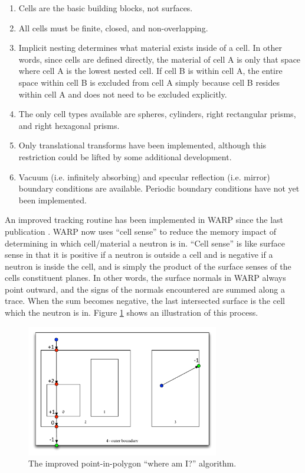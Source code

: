 \documentclass[preprint,12pt]{elsarticle}
\begin{document}
\begin{enumerate}
\item Cells are the basic building blocks, not surfaces.
\item All cells must be finite, closed, and non-overlapping.
\item Implicit nesting determines what material exists inside of a cell.  In other words, since cells are defined directly, the material of cell A is only that space where cell A is the lowest nested cell.  If cell B is within cell A, the entire space within cell B is excluded from cell A simply because cell B resides within cell A and does not need to be excluded explicitly.
\item The only cell types available are spheres, cylinders, right rectangular prisms, and right hexagonal prisms.
\item Only translational transforms have been implemented, although this restriction could be lifted by some additional development.
\item Vacuum (i.e. infinitely absorbing) and specular reflection  (i.e. mirror) boundary conditions are available.  Periodic boundary conditions have not yet been implemented.
\end{enumerate}

An improved tracking routine has been implemented in WARP since the last publication \cite{dissertation}.  WARP now uses ``cell sense'' to reduce the memory impact of determining in which cell/material a neutron is in.  ``Cell sense'' is like surface sense in that it is positive if a neutron is outside a cell and is negative if a neutron is inside the cell, and is simply the product of the surface senses of the cells constituent planes.  In other words, the surface normals in WARP always point outward, and the signs of the normals encountered are summed along a trace.  When the sum becomes negative, the last intersected surface is the cell which the neutron is in.   Figure \ref{whereami} shows an illustration of this process.

\begin{figure}[h!]
\centering
\includegraphics[width=0.75\textwidth]{graphics/whereami-new.pdf}
\caption{The improved point-in-polygon ``where am I?'' algorithm. \label{whereami} }
\end{figure}
\end{document}

